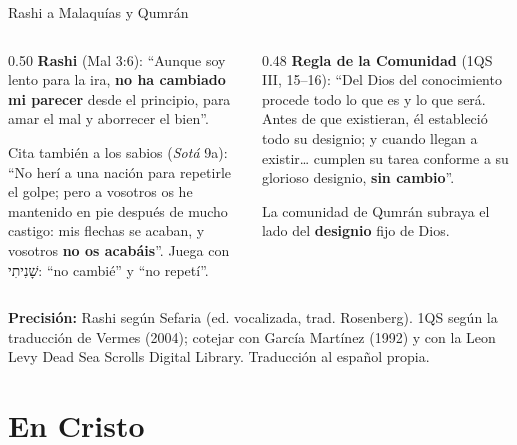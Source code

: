 \documentclass[hyperref={bookmarks=false},aspectratio=169]{beamer}
\newcommand{\heb}[1]{\mbox{\foreignlanguage{hebrew}{#1}}}
\newcommand{\destacar}[1]{\textbf{\textcolor{azul}{#1}}}
\newcommand{\precision}[1]{{\footnotesize\color{gris}\textbf{Precisión:} #1}}
\begin{document}
\begin{frame}{Rashi a Malaquías y Qumrán}
\begin{columns}[t,onlytextwidth]
\begin{column}{0.50\textwidth}\scriptsize
\textbf{Rashi} (Mal 3:6): ``Aunque soy lento para la ira, \destacar{no ha cambiado mi parecer} desde el principio, para amar el mal y aborrecer el bien''.\par\smallskip
Cita también a los sabios (\emph{Sotá} 9a): ``No herí a una nación para repetirle el golpe; pero a vosotros os he mantenido en pie después de mucho castigo: mis flechas se acaban, y vosotros \destacar{no os acabáis}''. Juega con \heb{שָׁנִיתִי}: ``no cambié'' y ``no repetí''.
\end{column}
\begin{column}{0.48\textwidth}\scriptsize
\textbf{Regla de la Comunidad} (1QS III, 15--16): ``Del Dios del conocimiento procede todo lo que es y lo que será. Antes de que existieran, él estableció todo su designio; y cuando llegan a existir\ldots{} cumplen su tarea conforme a su glorioso designio, \destacar{sin cambio}''.\par\smallskip
La comunidad de Qumrán subraya el lado del \destacar{designio} fijo de Dios.
\end{column}
\end{columns}\par\smallskip
\precision{Rashi según Sefaria (ed. vocalizada, trad. Rosenberg). 1QS según la traducción de Vermes (2004); cotejar con García Martínez (1992) y con la Leon Levy Dead Sea Scrolls Digital Library. Traducción al español propia.}
\end{frame}

\section{En Cristo}
\end{document}
